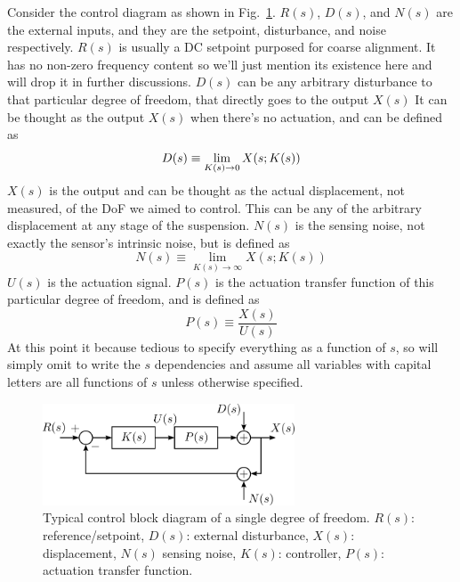 Consider the control diagram as shown in Fig.~\ref{fig:generalcontrolblockdiagram}.
$R(s)$, $D(s)$, and $N(s)$ are the external inputs, and they are the setpoint, disturbance, and noise respectively.
$R(s)$ is usually a DC setpoint purposed for coarse alignment.
It has no non-zero frequency content so we'll just mention its existence here and will drop it in further discussions.
$D(s)$ can be any arbitrary disturbance to that particular degree of freedom, that directly goes to the output $X(s)$
It can be thought as the output $X(s)$ when there's no actuation, and can be defined as
\begin{equation}
	D(s) \equiv \lim_{K(s)\to 0} X\mleft(s;K(s)\mright)
\end{equation}
$X(s)$ is the output and can be thought as the actual displacement, not measured, of the DoF we aimed to control.
This can be any of the arbitrary displacement at any stage of the suspension.
$N(s)$ is the sensing noise, not exactly the sensor's intrinsic noise, but is defined as
\begin{equation}
	N(s) \equiv \lim_{K(s)\to\infty} X(s;K(s))
\end{equation}
$U(s)$ is the actuation signal.
$P(s)$ is the actuation transfer function of this particular degree of freedom, and is defined as
\begin{equation}
	P(s) \equiv \frac{X(s)}{U(s)}
\end{equation}
At this point it because tedious to specify everything as a function of $s$, so will simply omit to write the $s$ dependencies and assume all variables with capital letters are all functions of $s$ unless otherwise specified.
\begin{figure}[!h]
	\centering
	\includegraphics[width=75mm]{figures/general_control_block_diagram}
	\caption{Typical control block diagram of a single degree of freedom. $R(s)$: reference/setpoint, $D(s)$: external disturbance, $X(s)$: displacement, $N(s)$ sensing noise, $K(s)$: controller, $P(s)$: actuation transfer function.}
	\label{fig:generalcontrolblockdiagram}
\end{figure}

